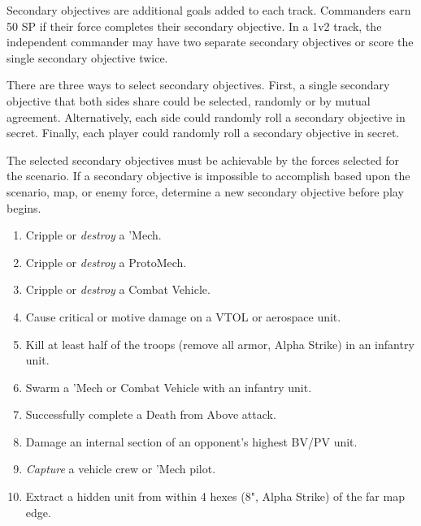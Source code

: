 Secondary objectives are additional goals added to each track.
Commanders earn 50 SP if their force completes their secondary objective.
In a 1v2 track, the independent commander may have two separate secondary objectives or score the single secondary objective twice.

There are three ways to select secondary objectives.
First, a single secondary objective that both sides share could be selected, randomly or by mutual agreement.
Alternatively, each side could randomly roll a secondary objective in secret.
Finally, each player could randomly roll a secondary objective in secret.

The selected secondary objectives must be achievable by the forces selected for the scenario.
If a secondary objective is impossible to accomplish based upon the scenario, map, or enemy force, determine a new secondary objective before play begins.

\begin{enumerate}

\item Cripple or \emph{destroy} a 'Mech.

\item Cripple or \emph{destroy} a ProtoMech.

\item Cripple or \emph{destroy} a Combat Vehicle.

\item Cause critical or motive damage on a VTOL or aerospace unit.

\item Kill at least half of the troops (remove all armor, Alpha Strike) in an infantry unit.

\item Swarm a 'Mech or Combat Vehicle with an infantry unit.

\item Successfully complete a Death from Above attack.

\item Damage an internal section of an opponent's highest BV/PV unit.

\item \emph{Capture} a vehicle crew or 'Mech pilot.

\item Extract a hidden unit from within 4 hexes (8", Alpha Strike) of the far map edge.

\end{enumerate}
